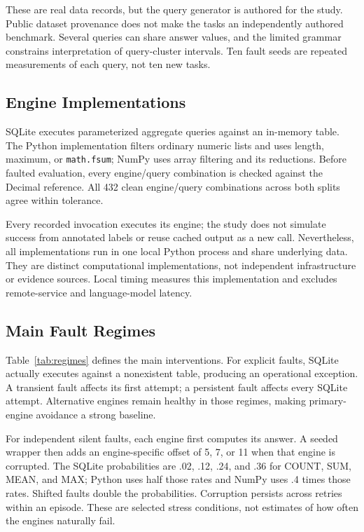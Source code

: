 \documentclass{svproc}
\begin{document}
These are real data records, but the query generator is authored for the study. Public dataset provenance does not make the tasks an independently authored benchmark. Several queries can share answer values, and the limited grammar constrains interpretation of query-cluster intervals. Ten fault seeds are repeated measurements of each query, not ten new tasks.

\subsection{Engine Implementations}
SQLite executes parameterized aggregate queries against an in-memory table. The Python implementation filters ordinary numeric lists and uses length, maximum, or \texttt{math.fsum}; NumPy uses array filtering and its reductions. Before faulted evaluation, every engine/query combination is checked against the Decimal reference. All 432 clean engine/query combinations across both splits agree within tolerance.

Every recorded invocation executes its engine; the study does not simulate success from annotated labels or reuse cached output as a new call. Nevertheless, all implementations run in one local Python process and share underlying data. They are distinct computational implementations, not independent infrastructure or evidence sources. Local timing measures this implementation and excludes remote-service and language-model latency.

\subsection{Main Fault Regimes}

Table~\ref{tab:regimes} defines the main interventions. For explicit faults, SQLite actually executes against a nonexistent table, producing an operational exception. A transient fault affects its first attempt; a persistent fault affects every SQLite attempt. Alternative engines remain healthy in those regimes, making primary-engine avoidance a strong baseline.

For independent silent faults, each engine first computes its answer. A seeded wrapper then adds an engine-specific offset of 5, 7, or 11 when that engine is corrupted. The SQLite probabilities are .02, .12, .24, and .36 for COUNT, SUM, MEAN, and MAX; Python uses half those rates and NumPy uses .4 times those rates. Shifted faults double the probabilities. Corruption persists across retries within an episode. These are selected stress conditions, not estimates of how often the engines naturally fail.
\end{document}
